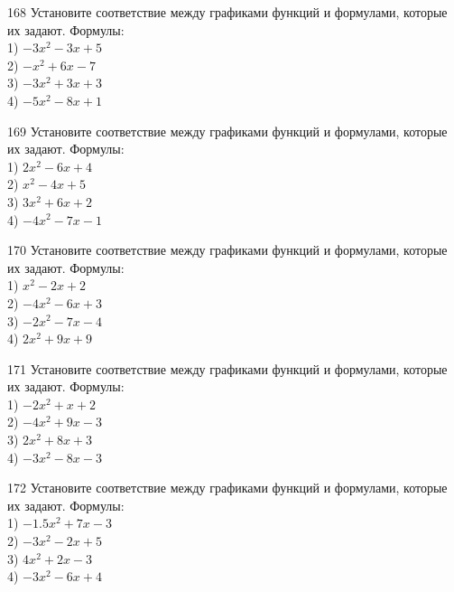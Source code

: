 \documentclass[4apaper]{article}
\begin{document}
\begin{taskBN}{168}
Установите соответствие между графиками функций и формулами, которые их задают. Формулы: \\1) $-3x^2-3x+5$\\2) $-x^2+6x-7$\\3) $-3x^2+3x+3$\\4) $-5x^2-8x+1$
\end{taskBN}

\begin{taskBN}{169}
Установите соответствие между графиками функций и формулами, которые их задают. Формулы: \\1) $2x^2-6x+4$\\2) $x^2-4x+5$\\3) $3x^2+6x+2$\\4) $-4x^2-7x-1$
\end{taskBN}

\begin{taskBN}{170}
Установите соответствие между графиками функций и формулами, которые их задают. Формулы: \\1) $x^2-2x+2$\\2) $-4x^2-6x+3$\\3) $-2x^2-7x-4$\\4) $2x^2+9x+9$
\end{taskBN}

\begin{taskBN}{171}
Установите соответствие между графиками функций и формулами, которые их задают. Формулы: \\1) $-2x^2+x+2$\\2) $-4x^2+9x-3$\\3) $2x^2+8x+3$\\4) $-3x^2-8x-3$
\end{taskBN}

\begin{taskBN}{172}
Установите соответствие между графиками функций и формулами, которые их задают. Формулы: \\1) $-1.5x^2+7x-3$\\2) $-3x^2-2x+5$\\3) $4x^2+2x-3$\\4) $-3x^2-6x+4$
\end{taskBN}
\end{document}
